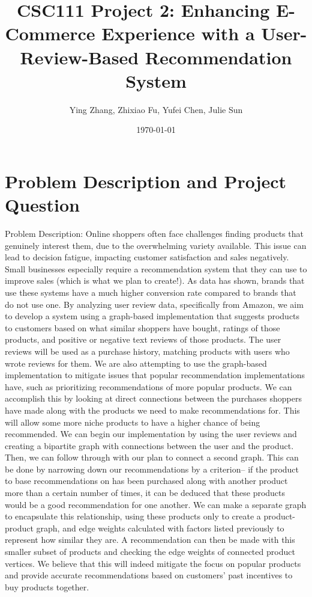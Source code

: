 \documentclass[fontsize=11pt]{article}
\title{CSC111 Project 2: Enhancing E-Commerce Experience with a User-Review-Based Recommendation System }
\author{Ying Zhang, Zhixiao Fu, Yufei Chen, Julie Sun}
\date{\today}
\begin{document}
\maketitle

\section*{Problem Description and Project Question}
Problem Description:
Online shoppers often face challenges finding products that genuinely interest them, due to the overwhelming variety available. This issue can lead to decision fatigue, impacting customer satisfaction and sales negatively. Small businesses especially require a recommendation system that they can use to improve sales (which is what we plan to create!). As data has shown, brands that use these systems have a much higher conversion rate compared to brands that do not use one. By analyzing user review data, specifically from Amazon, we aim to develop a system using a graph-based implementation that suggests products to customers based on what similar shoppers have bought, ratings of those products, and positive or negative text reviews of those products. The user reviews will be used as a purchase history, matching products with users who wrote reviews for them. We are also attempting to use the graph-based implementation to mitigate issues that popular recommendation implementations have, such as prioritizing recommendations of more popular products. We can accomplish this by looking at direct connections between the purchases shoppers have made along with the products we need to make recommendations for. This will allow some more niche products to have a higher chance of being recommended. We can begin our implementation by using the user reviews and creating a bipartite graph with connections between the user and the product. Then, we can follow through with our plan to connect a second graph. This can be done by narrowing down our recommendations by a criterion-- if the product to base recommendations on has been purchased along with another product more than a certain number of times, it can be deduced that these products would be a good recommendation for one another. We can make a separate graph to encapsulate this relationship, using these products only to create a product-product graph, and edge weights calculated with factors listed previously to represent how similar they are. A recommendation can then be made with this smaller subset of products and checking the edge weights of connected product vertices. We believe that this will indeed mitigate the focus on popular products and provide accurate recommendations based on customers' past incentives to buy products together.
\end{document}
